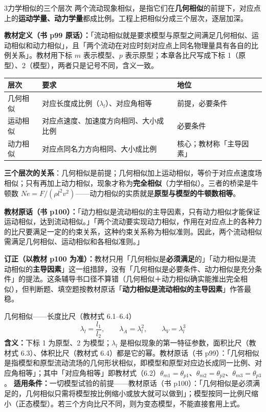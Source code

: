 \begin{kaodian}{3}{力学相似的三个层次}
两个流动现象相似，是指它们在\textbf{几何相似}的前提下，对应点上的\textbf{运动学量、动力学量}都成比例。工程上把相似分成三个层次，逐层加深。

\textbf{教材定义（书 p99 原话）：}「流动相似就是要求模型与原型之间满足几何相似、运动相似和动力相似」，且「两个流动在对应时刻对应点上同名物理量具有各自的比例关系」。教材用下标 $m$ 表示模型、$p$ 表示原型；本章各比尺写成下标 1（原型）、2（模型），两者只是记号不同，含义一致。

\begin{center}
\begin{tabularx}{\textwidth}{@{}lXX@{}}
\toprule
层次 & 要求 & 地位 \\
\midrule
几何相似 & 对应长度成比例（$\lambda_l$）、对应角相等 & 前提，必要条件 \\
运动相似 & 对应点速度、加速度方向相同、大小成比例 & 必要条件 \\
动力相似 & 对应点同名力方向相同、大小成比例 & 核心；教材称「主导因素」 \\
\bottomrule
\end{tabularx}
\end{center}

\textbf{三个层次的关系}：几何相似是前提；几何相似加上运动相似，等价于对应点速度场相似；只有再加上动力相似，现象才称为\textbf{完全相似}（力学相似）。三者的桥梁是牛顿数 $Ne=F/(\rho l^2 v^2)$——动力相似的实质就是\textbf{原型与模型的牛顿数相等}。

\textbf{教材原话（书 p100）：}「动力相似是流动相似的主导因素，只有动力相似才能保证运动相似，达到流动相似。」「两个流动要实现动力相似，作用在对应点上的各种力的比尺要满足一定的约束关系，这种约束关系称为相似准则。因此，两个流动相似需满足几何相似、运动相似和各相似准则。」

\begin{tishi}
\textbf{订正（以教材 p100 为准）：}教材只用「几何相似是\textbf{必须满足}的」「动力相似是流动相似的\textbf{主导因素}」这一组措辞，没有「几何相似是必要条件、动力相似是充分条件」的提法。这条辅导书口径不算错（几何相似＋动力相似确实能推出完全相似），但判断题、填空题按教材原话「\textbf{动力相似是流动相似的主导因素}」作答最稳。
\end{tishi}
\end{kaodian}

\begin{gongshi}{几何相似——长度比尺（教材式 6.1--6.4）}
\[ \lambda_l=\frac{l_1}{l_2},\qquad \lambda_A=\lambda_l^{2},\qquad \lambda_V=\lambda_l^{3} \]
\textbf{含义：}下标 1 为原型、2 为模型；$\lambda_l$ 是相似现象的第一特征参数，面积比尺（教材式 6.3）、体积比尺（教材式 6.4）都是它的幂。教材原话（书 p99）：「几何相似是指模型和原型流动流场的几何形状相似，即模型和原型对应边长成同一比例、对应角相等」；其中「对应角相等」即教材式（6.2）$\theta_{m1}=\theta_{p1}$、$\theta_{m2}=\theta_{p2}$、$\theta_{m3}=\theta_{p3}$。
\textbf{适用条件：}一切模型试验的前提——教材原话（书 p100）：「几何相似是必须满足的，几何相似只需将模型按比例缩小或放大就可以做到」；模型按同一比例尺缩小（正态模型）。若三个方向比尺不同，则为变态模型，不能直接套用上式。
\end{gongshi}

